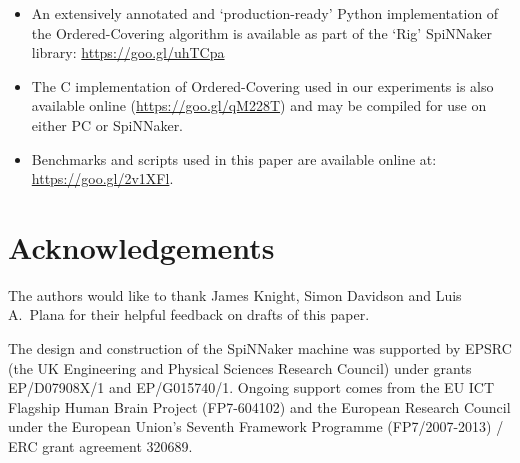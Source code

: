 \documentclass[conference]{IEEEtran}
\begin{document}
\small
\begin{itemize}
  \item An extensively annotated and `production-ready' Python implementation of the Ordered-Covering algorithm is available as part of the `Rig' SpiNNaker library: \url{https://goo.gl/uhTCpa}
  \item The C implementation of Ordered-Covering used in our experiments is also available online (\url{https://goo.gl/qM228T}) and may be compiled for use on either PC or SpiNNaker.
  \item Benchmarks and scripts used in this paper are available online at: \\\url{https://goo.gl/2v1XFl}.
\end{itemize}

\section*{Acknowledgements}
\small The authors would like to thank James Knight, Simon Davidson and Luis A.\ Plana for their helpful feedback on drafts of this paper.

The design and construction of the SpiNNaker machine was supported by EPSRC (the UK Engineering and Physical Sciences Research Council) under grants EP/D07908X/1 and EP/G015740/1.
Ongoing support comes from the EU ICT Flagship Human Brain Project (FP7-604102) and the European Research Council under the European Union's Seventh Framework Programme (FP7/2007-2013) / ERC grant agreement 320689.

\newpage
\printbibliography
\end{document}
